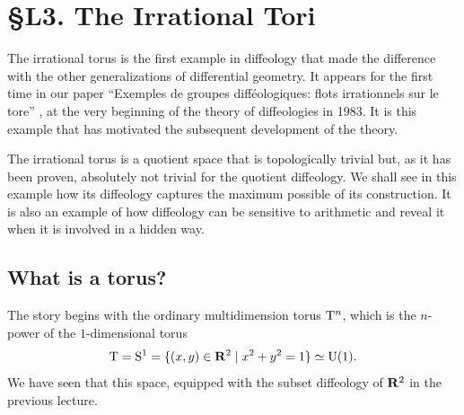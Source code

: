 
\chapter*{\S L3. The Irrational Tori}
\setcounter{footnote}{0}

\begin{abstract}
  In this lecture we will study the examples of irrational tori,
  quotients of torus $\Torus^n$ by irrational hyperplanes.
\end{abstract}


The irrational torus is the first example in diffeology that made the difference with the other generalizations of differential geometry.
It appears for the first time in our paper ``Exemples de groupes diff\'eologiques: flots irrationnels sur le tore'' \cite{DI83},
at the very beginning of the theory of diffeologies in 1983.
It is this example that has motivated the subsequent development of the theory.

The irrational torus is a quotient space that is topologically trivial but,
as it has been proven,
absolutely not trivial for the quotient diffeology.
We shall see in this example how its diffeology captures the maximum possible of its construction.
It is also an example of how diffeology can be sensitive to arithmetic and reveal it when it is involved in a hidden way.

\section{What is a torus?}

The story begins with the ordinary multidimension torus $\Torus^n$,
which is the $n$-power of the $1$-dimensional torus
$$%
  \Torus = \Sph^1 = \{ (x,y) \in \RR^2 \mid x^2 + y^2 = 1 \} \simeq \U(1).
  $$%
We have seen that this space,
equipped with the subset diffeology of $\mathbf{R}^2$ in the previous lecture.

